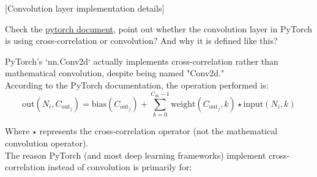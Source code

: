 \item {} [Convolution layer implementation details]

Check the \href{https://pytorch.org/docs/stable/generated/torch.nn.Conv2d.html#torch.nn.Conv2d}{pytorch document}, point out whether the convolution layer in PyTorch is using cross-correlation or convolution? And why it is defined like this? 

\solution

PyTorch's `nn.Conv2d` actually implements cross-correlation rather than mathematical convolution, despite being named "Conv2d."\\

According to the PyTorch documentation, the operation performed is:
$$\text{out}(N_i, C_{\text{out}_j}) = \text{bias}(C_{\text{out}_j}) + \sum_{k=0}^{C_{\text{in}}-1} \text{weight}(C_{\text{out}_j}, k) \star \text{input}(N_i, k)$$

Where $\star$ represents the cross-correlation operator (not the mathematical convolution operator).\\

The reason PyTorch (and most deep learning frameworks) implement cross-correlation instead of convolution is primarily for:

